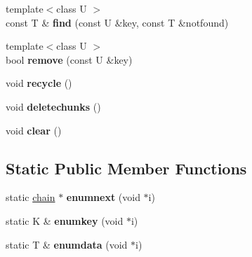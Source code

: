 \begin{DoxyCompactItemize}
\mbox{\label{structhashbase_a151c6709ccf7b057e9f0e841fd67fda9}} 
{\footnotesize template$<$class U $>$ }\\const T \& {\bfseries find} (const U \&key, const T \&notfound)
\item 
\mbox{\label{structhashbase_ae032e2e2ea6f7caddb77d03501fcb9cd}} 
{\footnotesize template$<$class U $>$ }\\bool {\bfseries remove} (const U \&key)
\item 
\mbox{\label{structhashbase_a1a50ac106c87f05a155037698d8887fe}} 
void {\bfseries recycle} ()
\item 
\mbox{\label{structhashbase_a1ef02c93cfa6e0d59c14d4a09d99db2d}} 
void {\bfseries deletechunks} ()
\item 
\mbox{\label{structhashbase_aaee9d8fca8fb4077defa31be500b643d}} 
void {\bfseries clear} ()
\end{DoxyCompactItemize}
\subsection*{Static Public Member Functions}
\begin{DoxyCompactItemize}
\item 
\mbox{\label{structhashbase_aad23144a39ee5bb6cf549a86664e26a7}} 
static \hyperlink{structhashbase_1_1chain}{chain} $\ast$ {\bfseries enumnext} (void $\ast$i)
\item 
\mbox{\label{structhashbase_a0ef25f4bde4909fa55b32ca430b1e5e6}} 
static K \& {\bfseries enumkey} (void $\ast$i)
\item 
\mbox{\label{structhashbase_ad25120ee6c3050418948bda379115560}} 
static T \& {\bfseries enumdata} (void $\ast$i)
\end{DoxyCompactItemize}
